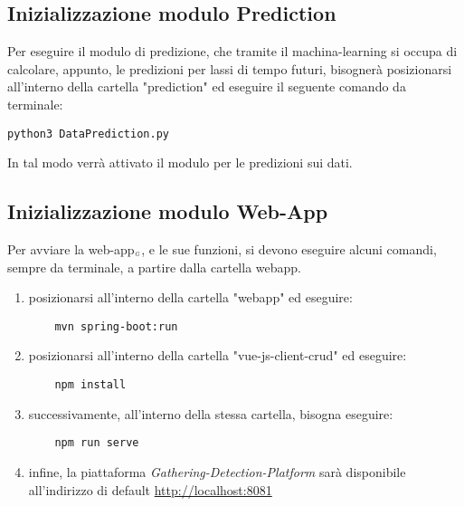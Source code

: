 \subsection{Inizializzazione modulo Prediction}\label{RequisitiDiSistemaEdInstallazioneInstallazioneInizializzazioneModuloPrediction}
Per eseguire il modulo di predizione, che tramite il machina-learning si occupa di calcolare, appunto, le predizioni per lassi di tempo futuri, bisognerà posizionarsi all'interno della cartella "prediction" ed eseguire il seguente comando da terminale:

\begin{lstlisting}
python3 DataPrediction.py
\end{lstlisting}
In tal modo verrà attivato il modulo per le predizioni sui dati.


\subsection{Inizializzazione modulo Web-App}\label{RequisitiDiSistemaEdInstallazioneInstallazioneInizializzazioneModuloWebApp}
Per avviare la web-app$_{\scaleto{G}{3pt}}$, e le sue funzioni, si devono eseguire alcuni comandi, sempre da terminale, a partire dalla cartella webapp.
\begin{enumerate}
	\item posizionarsi all'interno della cartella "webapp" ed eseguire:
	\begin{lstlisting}
	mvn spring-boot:run
	\end{lstlisting}
	\item posizionarsi all'interno della cartella "vue-js-client-crud" ed eseguire:
	\begin{lstlisting}
	npm install
	\end{lstlisting}
	\item successivamente, all'interno della stessa cartella, bisogna eseguire:
	\begin{lstlisting}
	npm run serve
	\end{lstlisting}
	\item infine, la piattaforma \textit{Gathering-Detection-Platform} sarà disponibile all'indirizzo di default \url{http://localhost:8081} 
\end{enumerate}
